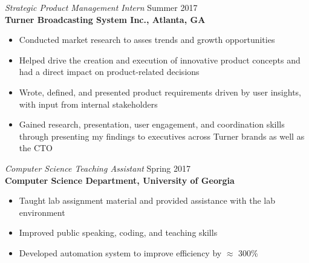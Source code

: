 \documentclass[line,margin]{res}
\begin{document}
\begin{resume}
		{\sl Strategic Product Management Intern} \hfill Summer 2017 \\
                \textbf{Turner Broadcasting System Inc., Atlanta, GA}
                 \begin{itemize}  \itemsep -2pt %
                 \item Conducted market research to asses trends and growth opportunities 
                	\item  Helped drive the creation and execution of innovative product concepts and had a direct impact on product-related decisions
		\item Wrote, defined, and presented product requirements driven by user insights, with input from internal stakeholders
		\item Gained research, presentation, user engagement, and coordination skills through presenting my findings to executives across Turner brands as well as the CTO
                \end{itemize}
 
                {\sl Computer Science Teaching Assistant} \hfill            Spring 2017 \\
                \textbf{Computer Science Department, University of Georgia} 
                 \begin{itemize}  \itemsep -2pt %
                 \item Taught lab assignment material and provided assistance with the lab environment
                 \item Improved public speaking, coding, and teaching skills
                 \item Developed automation system to improve efficiency by $\approx$ 300\%
                 \end{itemize} 



\end{resume}
\end{document}
